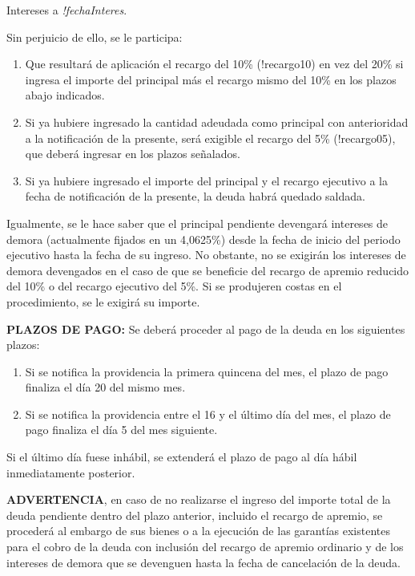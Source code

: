 \documentclass[12pt, a4paper, twoside]{article}
\begin{document}
Intereses a \emph{!fechaInteres}.

Sin perjuicio de ello, se le participa:
\begin{enumerate}
    \item Que resultará de aplicación el recargo del 10\% (!recargo10) en vez del 20\% si ingresa el importe del principal más el recargo mismo del 10\% en los plazos abajo indicados.
    \item Si ya hubiere ingresado la cantidad adeudada como principal con anterioridad a la notificación de la presente, será exigible el recargo del 5\% (!recargo05), que deberá ingresar en los plazos señalados.
    \item Si ya hubiere ingresado el importe del principal y el recargo ejecutivo a la fecha de notificación de la presente, la deuda habrá quedado saldada.
\end{enumerate}

Igualmente, se le hace saber que el principal pendiente devengará intereses de demora (actualmente fijados en un 4,0625\%) desde la fecha de inicio del periodo ejecutivo hasta la fecha de su ingreso. No obstante, no se exigirán los intereses de demora devengados en el caso de que se beneficie del recargo de apremio reducido del 10\% o del recargo ejecutivo del 5\%. Si se produjeren costas en el procedimiento, se le exigirá su importe.

\textbf{PLAZOS DE PAGO:} Se deberá proceder al pago de la deuda en los siguientes plazos:
\begin{enumerate}
    \item Si se notifica la providencia la primera quincena del mes, el plazo de pago finaliza el día 20 del mismo mes.
    \item Si se notifica la providencia entre el 16 y el último día del mes, el plazo de pago finaliza el día 5 del mes siguiente.
\end{enumerate}

Si el último día fuese inhábil, se extenderá el plazo de pago al día hábil inmediatamente posterior.

\textbf{ADVERTENCIA}, en caso de no realizarse el ingreso del importe total de la deuda pendiente dentro del plazo anterior, incluido el recargo de apremio, se procederá al embargo de sus bienes o a la ejecución de las garantías existentes para el cobro de la deuda con inclusión del recargo de apremio ordinario y de los intereses de demora que se devenguen hasta la fecha de cancelación de la deuda.

\end{document}

